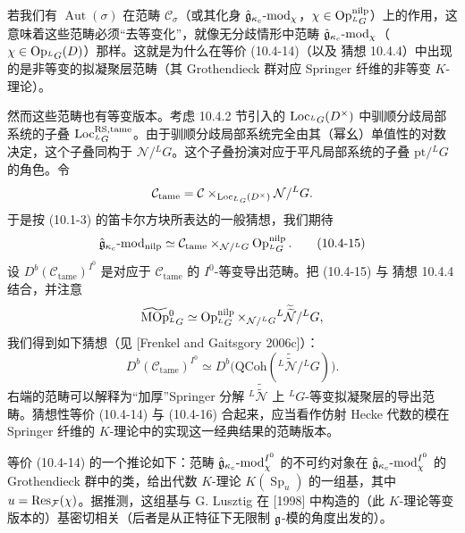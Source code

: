 若我们有 $\operatorname{Aut}(\sigma)$ 在范畴 $\mathcal{C}_\sigma$（或其化身 $\hat{\mathfrak{g}}_{\kappa_c}\text{-}\mathrm{mod}_\chi$，$\chi\in\operatorname{Op}^{\mathrm{nilp}}_{{}^L G}$）上的作用，这意味着这些范畴必须“去等变化”，就像无分歧情形中范畴 $\hat{\mathfrak{g}}_{\kappa_c}\text{-}\mathrm{mod}_\chi$（$\chi\in\operatorname{Op}_{{}^L G}(D)$）那样。这就是为什么在等价 (10.4-14)（以及 猜想 10.4.4）中出现的是非等变的拟凝聚层范畴（其 Grothendieck 群对应 Springer 纤维的非等变 $K$-理论）。

然而这些范畴也有等变版本。考虑 10.4.2 节引入的 $\operatorname{Loc}_{{}^L G}(D^\times)$ 中驯顺分歧局部系统的子叠 $\operatorname{Loc}^{\mathrm{RS,tame}}_{{}^L G}$。由于驯顺分歧局部系统完全由其（幂幺）单值性的对数决定，这个子叠同构于 $\mathcal{N}/{}^L G$。这个子叠扮演对应于平凡局部系统的子叠 $\mathrm{pt}/{}^L G$ 的角色。令
\[
    \mathcal{C}_{\mathrm{tame}}
    =\mathcal{C}\times_{\operatorname{Loc}_{{}^L G}(D^\times)}\mathcal{N}/{}^L G.
\]
于是按 (10.1-3) 的笛卡尔方块所表达的一般猜想，我们期待
\begin{equation}
    \hat{\mathfrak{g}}_{\kappa_c}\text{-}\mathrm{mod}_{\mathrm{nilp}}
    \simeq\mathcal{C}_{\mathrm{tame}}
    \times_{\mathcal{N}/{}^L G}\operatorname{Op}^{\mathrm{nilp}}_{{}^L G}.
    \tag{10.4-15}
\end{equation}
设 $D^b(\mathcal{C}_{\mathrm{tame}})^{I^0}$ 是对应于 $\mathcal{C}_{\mathrm{tame}}$ 的 $I^0$-等变导出范畴。把 (10.4-15) 与 猜想 10.4.4 结合，并注意
\[
    \widetilde{\mathrm{MOp}}{}^0_{{}^L G}
    \simeq\operatorname{Op}^{\mathrm{nilp}}_{{}^L G}
    \times_{\mathcal{N}/{}^L G}
    {}^{L}\widetilde{\widetilde{\mathcal{N}}}/{}^L G,
\]
我们得到如下猜想（见 [Frenkel and Gaitsgory 2006c]）：
\begin{equation}
    D^b(\mathcal{C}_{\mathrm{tame}})^{I^0}
    \simeq D^b\bigl(\mathrm{QCoh}({}^{L}\widetilde{\widetilde{\mathcal{N}}}/{}^L G)\bigr).
    \tag{10.4-16}
\end{equation}
右端的范畴可以解释为“加厚”Springer 分解 ${}^L\widetilde{\widetilde{\mathcal{N}}}$ 上 ${}^L G$-等变拟凝聚层的导出范畴。猜想性等价 (10.4-14) 与 (10.4-16) 合起来，应当看作仿射 Hecke 代数的模在 Springer 纤维的 $K$-理论中的实现这一经典结果的范畴版本。

等价 (10.4-14) 的一个推论如下：范畴 $\hat{\mathfrak{g}}_{\kappa_c}\text{-}\mathrm{mod}_\chi^{I^0}$ 的不可约对象在 $\hat{\mathfrak{g}}_{\kappa_c}\text{-}\mathrm{mod}_\chi^{I^0}$ 的 Grothendieck 群中的类，给出代数 $K$-理论 $K(\operatorname{Sp}_u)$ 的一组基，其中 $u=\operatorname{Res}_{\mathcal{F}}(\chi)$。据推测，这组基与 G. Lusztig 在 [1998] 中构造的（此 $K$-理论等变版本的）基密切相关（后者是从正特征下无限制 $\mathfrak{g}$-模的角度出发的）。


